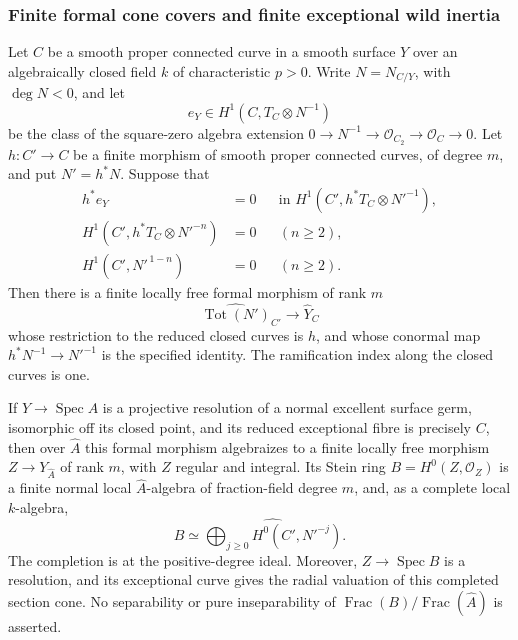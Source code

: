\subsubsection{Finite formal cone covers and finite exceptional wild inertia}

\begin{lemma}
\label{D:finite-formal-cone-cover}
Let $C$ be a smooth proper connected curve in a smooth surface
$Y$ over an algebraically closed field $k$ of characteristic $p>0$.
Write $N=N_{C/Y}$, with $\deg N<0$, and let
\[
 e_Y\in H^1(C,T_C\otimes N^{-1})
\]
be the class of the square-zero algebra extension
$0\to N^{-1}\to\mathcal O_{C_2}\to\mathcal O_C\to0$.
Let $h:C'\to C$ be a finite morphism of smooth proper connected
curves, of degree $m$, and put $N'=h^*N$.  Suppose that
\begin{align}
 h^*e_Y&=0
     &&\text{in }H^1(C',h^*T_C\otimes N'^{-1}),\label{D:cone-first}\\
 H^1(C',h^*T_C\otimes N'^{-n})&=0
     &&(n\geq2),\label{D:cone-tangent}\\
 H^1(C',N'^{\,1-n})&=0
     &&(n\geq2).\label{D:cone-normal}
\end{align}
Then there is a finite locally free formal morphism of rank $m$
\[
 \widehat{\operatorname{Tot}(N')}_{C'}
                 \longrightarrow \widehat Y_C
\]
whose restriction to the reduced closed curves is $h$, and whose
conormal map $h^*N^{-1}\to N'^{-1}$ is the specified identity.
The ramification index along the closed curves is one.

If $Y\to\operatorname{Spec}A$ is a projective resolution of a
normal excellent surface germ, isomorphic off its closed point,
and its reduced exceptional fibre is precisely $C$, then over
$\widehat A$ this formal morphism algebraizes to a finite locally
free morphism $Z\to Y_{\widehat A}$ of rank $m$, with $Z$ regular
and integral.  Its Stein ring $B=H^0(Z,\mathcal O_Z)$ is a finite
normal local $\widehat A$-algebra of fraction-field degree $m$,
and, as a complete local $k$-algebra,
\[
 B\simeq\widehat{\bigoplus_{j\geq0}H^0(C',N'^{-j})}.
 \tag{FC}
\]
The completion is at the positive-degree ideal.  Moreover,
$Z\to\operatorname{Spec}B$ is a resolution, and its exceptional
curve gives the radial valuation of this completed section cone.
No separability or pure inseparability of
$\operatorname{Frac}(B)/\operatorname{Frac}(\widehat A)$ is asserted.
\end{lemma}

